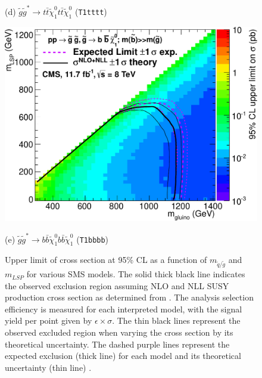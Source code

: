 \begin{figure}[ht]
\begin{minipage}[b]{0.48\linewidth}
\centering \caption*{(d) $\widetilde{g}\widetilde{g}^{*} \rightarrow t\bar{t}\widetilde{\chi}^{0}_{1}t\bar{t}\widetilde{\chi}^{0}_{1}$ (\texttt{T1tttt})} \label{fig:t2tttt}
\end{minipage}
\quad
\begin{minipage}[b]{0.48\linewidth}
\centering
\includegraphics[width = 1.0\linewidth]{plots/t1bbbb.pdf}
\centering \caption*{(e) $\widetilde{g}\widetilde{g}^{*} \rightarrow b\bar{b}\widetilde{\chi}^{0}_{1}b\bar{b}\widetilde{\chi}^{0}_{1}$ (\texttt{T1bbbb})} \label{fig:t1bbbb}
\end{minipage}
\caption[Upper limit of cross section at 95\% CL as a function of $m_{\widetilde{q}/\widetilde{g}}$ and $m_{LSP}$ for various \ac{SMS} models.]{Upper limit of cross section at 95\% CL as a function of $m_{\widetilde{q}/\widetilde{g}}$ and $m_{LSP}$ for various \ac{SMS} models. The solid thick black line indicates the observed exclusion region assuming \ac{NLO} and \ac{NLL}  SUSY production cross section as determined from \cite{Beenakker:1996ch}. The analysis selection efficiency is measured for each interpreted model, with the signal yield per point given by $\epsilon \times \sigma$. The thin black lines represent the observed excluded region when varying the cross section by its theoretical uncertainty. The dashed purple lines represent the expected exclusion (thick line) for each model and its theoretical uncertainty (thin line) \cite{ra1_epjc}.}
\label{fig:smslimitplots}
\end{figure}



